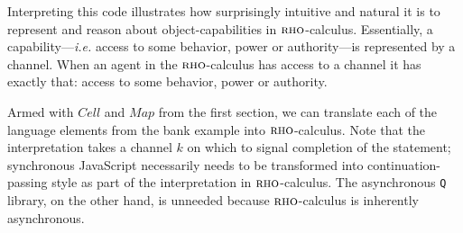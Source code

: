 \documentclass[]{acm_proc_article-sp}
\newcommand{\ldb}{[\![}
\newcommand{\rdb}{]\!]}
\newcommand{\id}[1]{\texttt{#1}}
\newcommand{\juxtap}{\mathbin{\id{|}}}
\newcommand{\binpar}[2]{#1 \juxtap #2}
\newcommand{\meaningof}[1]{\ldb #1 \rdb}
\newcommand{\defneqls}{\coloneqq}
\numberwithin{equation}{subsection}
\newcommand{\rhoc}{${\textsc{rho}}$-calculus}
\begin{document}
Interpreting this code illustrates how surprisingly intuitive and
natural it is to represent and reason about object-capabilities in
\rhoc. Essentially, a \\ capability---{\em i.e.} access to some behavior, power
or authority---is represented by a channel. When an agent in the \rhoc\;
has access to a channel it has exactly that: access to some behavior,
power or authority.


Armed with $Cell$ and $Map$ from the first section, we can translate
each of the language elements from the bank example into \rhoc.  Note
that the interpretation takes a channel $k$ on which to signal 
completion of the statement; synchronous JavaScript necessarily needs 
to be transformed into continuation-passing style as part of the
interpretation in {\rhoc}.  The asynchronous {\tt Q} library, on the other
hand, is unneeded because {\rhoc} is inherently asynchronous.  
\end{document}
